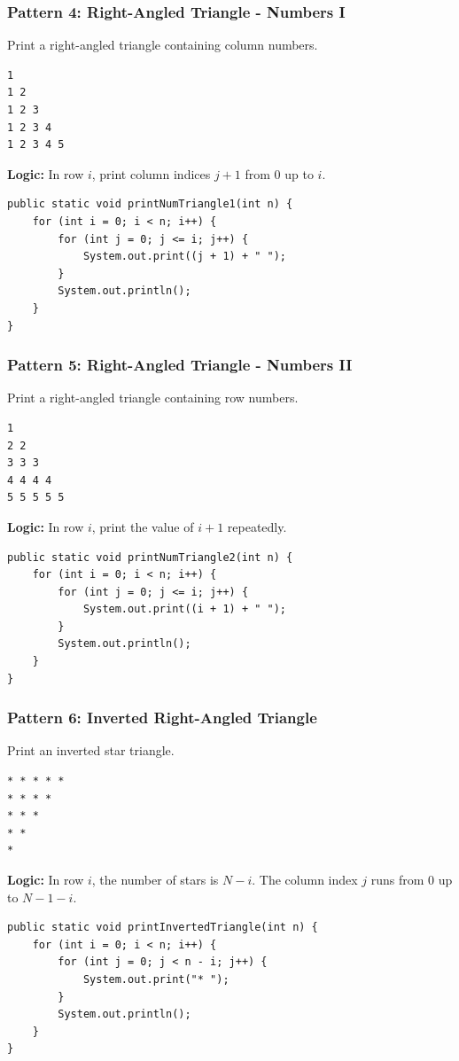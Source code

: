 \documentclass[12pt,a4paper,oneside]{book}
\begin{document}
\subsubsection{Pattern 4: Right-Angled Triangle - Numbers I}
Print a right-angled triangle containing column numbers.
\begin{lstlisting}[frame=single]
1
1 2
1 2 3
1 2 3 4
1 2 3 4 5
\end{lstlisting}
\textbf{Logic:} In row $i$, print column indices $j+1$ from $0$ up to $i$.
\begin{lstlisting}[caption={Right-Angled Triangle - Numbers I}]
public static void printNumTriangle1(int n) {
    for (int i = 0; i < n; i++) {
        for (int j = 0; j <= i; j++) {
            System.out.print((j + 1) + " ");
        }
        System.out.println();
    }
}
\end{lstlisting}

\subsubsection{Pattern 5: Right-Angled Triangle - Numbers II}
Print a right-angled triangle containing row numbers.
\begin{lstlisting}[frame=single]
1
2 2
3 3 3
4 4 4 4
5 5 5 5 5
\end{lstlisting}
\textbf{Logic:} In row $i$, print the value of $i+1$ repeatedly.
\begin{lstlisting}[caption={Right-Angled Triangle - Numbers II}]
public static void printNumTriangle2(int n) {
    for (int i = 0; i < n; i++) {
        for (int j = 0; j <= i; j++) {
            System.out.print((i + 1) + " ");
        }
        System.out.println();
    }
}
\end{lstlisting}

\subsubsection{Pattern 6: Inverted Right-Angled Triangle}
Print an inverted star triangle.
\begin{lstlisting}[frame=single]
* * * * *
* * * *
* * *
* *
*
\end{lstlisting}
\textbf{Logic:} In row $i$, the number of stars is $N-i$. The column index $j$ runs from $0$ up to $N-1-i$.
\begin{lstlisting}[caption={Inverted Right-Angled Triangle}]
public static void printInvertedTriangle(int n) {
    for (int i = 0; i < n; i++) {
        for (int j = 0; j < n - i; j++) {
            System.out.print("* ");
        }
        System.out.println();
    }
}
\end{lstlisting}
\end{document}

